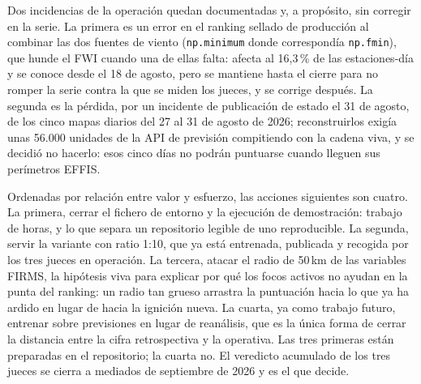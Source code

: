 \documentclass[10pt,a4paper]{article}
\begin{document}
Dos incidencias de la operación quedan documentadas y, a propósito, sin
corregir en la serie. La primera es un error en el ranking sellado de
producción al combinar las dos fuentes de viento (\texttt{np.minimum} donde
correspondía \texttt{np.fmin}), que hunde el FWI cuando una de ellas falta:
afecta al 16,3\,\% de las estaciones-día y se conoce desde el 18 de agosto,
pero se mantiene hasta el cierre para no romper la serie contra la que se
miden los jueces, y se corrige después. La segunda es la pérdida, por un
incidente de publicación de estado el 31 de agosto, de los cinco mapas diarios
del 27 al 31 de agosto de 2026; reconstruirlos exigía unas 56.000 unidades de
la API de previsión compitiendo con la cadena viva, y se decidió no hacerlo:
esos cinco días no podrán puntuarse cuando lleguen sus perímetros EFFIS.

Ordenadas por relación entre valor y esfuerzo, las acciones siguientes son
cuatro. La primera, cerrar el fichero de entorno y la ejecución de demostración:
trabajo de horas, y lo que separa un repositorio legible de uno reproducible. La
segunda, servir la variante con ratio 1:10, que ya está
entrenada, publicada y recogida por los tres jueces en operación. La tercera,
atacar el radio de 50\,km de las variables FIRMS, la hipótesis viva para explicar
por qué los focos activos no ayudan en la punta del ranking: un radio tan grueso
arrastra la puntuación hacia lo que ya ha ardido en lugar de hacia la ignición
nueva. La cuarta, ya como trabajo futuro, entrenar sobre previsiones en lugar de
reanálisis, que es la única forma de cerrar la distancia entre la cifra
retrospectiva y la operativa. Las tres primeras están preparadas en el
repositorio; la cuarta no. El veredicto acumulado de los tres jueces se cierra a
mediados de septiembre de 2026 y es el que decide.
\end{document}

